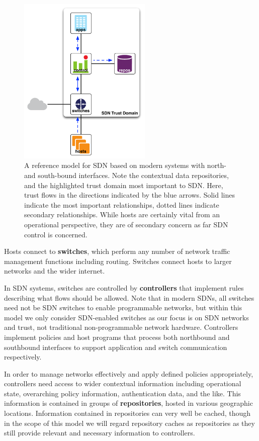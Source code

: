 \documentclass[10pt,conference]{IEEEtran}
\begin{document}
\begin{figure}[!t]
\centering
\includegraphics[width=2.5in]{images/reference-model.pdf}
\caption{A reference model for SDN based on modern systems with north- and south-bound interfaces.  Note the contextual data repositories, and the highlighted trust domain most important to SDN.  Here, trust flows in the directions indicated by the blue arrows.  Solid lines indicate the most important relationships, dotted lines indicate secondary relationships.  While hosts are certainly vital from an operational perspective, they are of secondary concern as far SDN control is concerned.}
\label{fig:reference-model}
\end{figure}

Hosts connect to {\bf switches}, which perform any number of network traffic management functions including routing.  Switches connect hosts to larger networks and the wider internet.  

In SDN systems, switches are controlled by {\bf controllers} that implement rules describing what flows should be allowed.  Note that in modern SDNs, all switches need not be SDN switches to enable programmable networks, but within this model we only consider SDN-enabled switches as our focus is on SDN networks and trust, not traditional non-programmable network hardware.  Controllers implement policies and host programs that process both northbound and southbound interfaces to support application and switch communication respectively.  

In order to manage networks effectively and apply defined policies appropriately, controllers need access to wider contextual information including operational state, overarching policy information, authentication data, and the like.  This information is contained in groups of {\bf repositories}, hosted in various geographic locations.  Information contained in repositories can very well be cached, though in the scope of this model we will regard repository caches as repositories as they still provide relevant and necessary information to controllers.  
\end{document}
